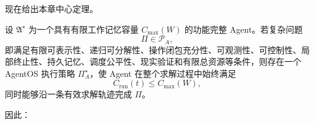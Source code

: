 现在给出本章中心定理。

\begin{theorem}
\label{thm:agentos-solvability}
设 $\mathfrak A^\star$ 为一个具有有限工作记忆容量 $C_{\max}(W)$ 的功能完整 Agent。若复杂问题
\begin{equation}
\Pi\in\mathscr P_A,
\end{equation}
即满足有限可表示性、递归可分解性、操作闭包充分性、可观测性、可控制性、局部终止性、持久记忆、调度公平性、现实验证和有限总资源等条件，则存在一个 AgentOS 执行策略 $\Pi_A^\star$，使 Agent 在整个求解过程中始终满足
\begin{equation}
C_{\mathrm{run}}(t)
\leq
C_{\max}(W),
\end{equation}
同时能够沿一条有效求解轨迹完成 $\Pi$。

因此：
\begin{statementbox}
\centering
{}
\end{statementbox}
\end{theorem}

